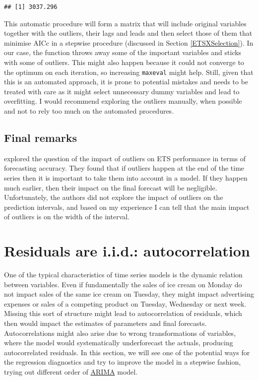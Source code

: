 \documentclass[
]{book}
\theoremstyle{definition}
\theoremstyle{definition}
\theoremstyle{definition}
\theoremstyle{definition}
\theoremstyle{remark}
\begin{document}
\begin{verbatim}
## [1] 3037.296
\end{verbatim}

This automatic procedure will form a matrix that will include original variables together with the outliers, their lags and leads and then select those of them that minimise AICc in a stepwise procedure (discussed in Section \ref{ETSXSelection}). In our case, the function throws away some of the important variables and sticks with some of outliers. This might also happen because it could not converge to the optimum on each iteration, so increasing \texttt{maxeval} might help. Still, given that this is an automated approach, it is prone to potential mistakes and needs to be treated with care as it might select unnecessary dummy variables and lead to overfitting. I would recommend exploring the outliers manually, when possible and not to rely too much on the automated procedures.

\hypertarget{final-remarks}{%
\subsection{Final remarks}\label{final-remarks}}

\citet{Koehler2012} explored the question of the impact of outliers on ETS performance in terms of forecasting accuracy. They found that if outliers happen at the end of the time series then it is important to take them into account in a model. If they happen much earlier, then their impact on the final forecast will be negligible. Unfortunately, the authors did not explore the impact of outliers on the prediction intervals, and based on my experience I can tell that the main impact of outliers is on the width of the interval.

\hypertarget{diagnosticsResidualsIIDAuto}{%
\section{Residuals are i.i.d.: autocorrelation}\label{diagnosticsResidualsIIDAuto}}

One of the typical characteristics of time series models is the dynamic relation between variables. Even if fundamentally the sales of ice cream on Monday do not impact sales of the same ice cream on Tuesday, they might impact advertising expenses or sales of a competing product on Tuesday, Wednesday or next week. Missing this sort of structure might lead to autocorrelation of residuals, which then would impact the estimates of parameters and final forecasts. Autocorrelations might also arise due to wrong transformations of variables, where the model would systematically underforecast the actuals, producing autocorrelated residuals. In this section, we will see one of the potential ways for the regression diagnostics and try to improve the model in a stepwise fashion, trying out different order of \protect\hyperlink{ADAMARIMA}{ARIMA} model.
\end{document}
